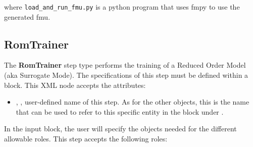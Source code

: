 where \verb|load_and_run_fmu.py| is a python program that uses fmpy to
use the generated fmu.



\subsection{RomTrainer}
\label{subsec:stepRomTrainer}
The \textbf{RomTrainer} step type performs the training of a Reduced Order
Model (aka Surrogate Mode).
%
The specifications of this step must be defined within a 
block.
%
This XML node accepts the attributes:
\vspace{-5mm}
\begin{itemize}
\itemsep0em
\item {}, , user-defined name of
this step.
\nb As for the other objects, this is the name that can be used to refer to this
specific entity in the  block under .
\end{itemize}
\vspace{-5mm}
In the  input block, the user will specify the objects
needed for the different allowable roles.
%
This step accepts the following roles:

